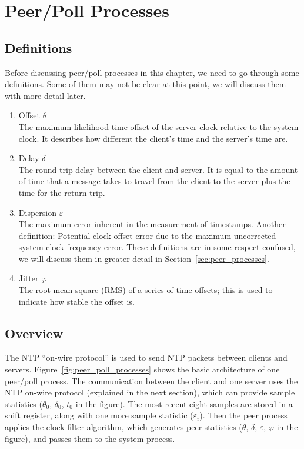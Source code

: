 \chapter{Peer/Poll Processes}
\label{cha:peer/poll_processes}

\section{Definitions}%
\label{sec:peer/poll_concepts}
Before discussing peer/poll processes in this chapter, we need to go through
some definitions. Some of them may not be clear at this point, we will discuss
them with more detail later.
\begin{enumerate}
    \item Offset $\theta$\\
        The maximum-likelihood time offset of the server clock relative to the
        system clock. It describes how different the client's time
        and the server's time are.
    \item Delay $\delta$\\
        The round-trip delay between the client and server. It is equal to the
        amount of time that a message takes to travel from the client to the
        server plus the time for the return trip.
    \item Dispersion $\varepsilon$\\
        The maximum error inherent in the measurement of timestamps.
        Another definition: Potential clock offset error due to the maximum
        uncorrected system clock frequency error.  These definitions are in
        some respect confused, we will discuss them in greater detail in
        Section~\ref{sec:peer_processes}.
    \item Jitter $\varphi$\\
        The root-mean-square (RMS) of a series of time offsets; this is used to
        indicate how stable the offset is.
\end{enumerate}

\section{Overview}%
\label{sec:peer_poll_overview}
The NTP ``on-wire protocol'' is used to send NTP packets between clients and
servers.  Figure~\ref{fig:peer_poll_processes} shows the basic architecture of
one peer/poll process. The communication between the client and one server
uses the NTP on-wire protocol (explained in the next section), which can
provide sample statistics ($\theta_0$, $\delta_0$, $t_0$ in the figure).  The most
recent eight samples are stored in a shift register, along with one more sample
statistic ($\varepsilon_i$). Then the peer process applies the clock
filter algorithm, which generates peer statistics ($\theta$, $\delta$,
$\varepsilon$, $\varphi$ in the figure), and passes them to the system process.

